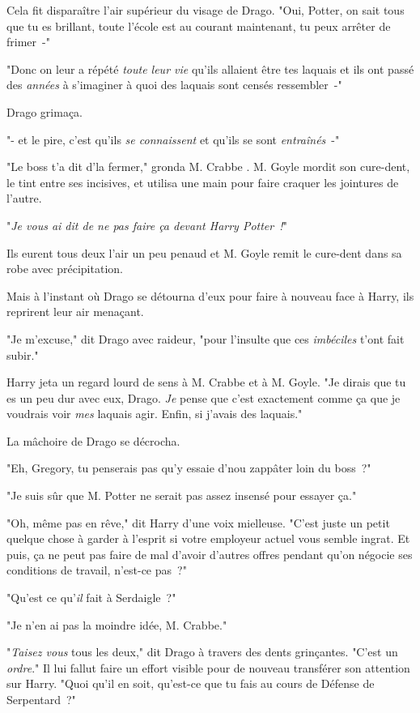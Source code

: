 Cela fit disparaître l'air supérieur du visage de Drago. "Oui, Potter, on sait tous que tu es brillant, toute l'école est au courant maintenant, tu peux arrêter de frimer~-"

"Donc on leur a répété \emph{toute leur vie} qu'ils allaient être tes laquais et ils ont passé des \emph{années} à s'imaginer à quoi des laquais sont censés ressembler~-"

Drago grimaça.

"- et le pire, c'est qu'ils \emph{se connaissent} et qu'ils se sont \emph{entraînés}~-"

"Le boss t'a dit d'la fermer," gronda M. Crabbe . M. Goyle mordit son cure-dent, le tint entre ses incisives, et utilisa une main pour faire craquer les jointures de l'autre.

"\emph{Je vous ai dit de ne pas faire ça devant Harry Potter~!}"

Ils eurent tous deux l'air un peu penaud et M. Goyle remit le cure-dent dans sa robe avec précipitation.

Mais à l'instant où Drago se détourna d'eux pour faire à nouveau face à Harry, ils reprirent leur air menaçant.

"Je m'excuse," dit Drago avec raideur, "pour l'insulte que ces \emph{imbéciles} t'ont fait subir."

Harry jeta un regard lourd de sens à M. Crabbe et à M. Goyle. "Je dirais que tu es un peu dur avec eux, Drago. \emph{Je} pense que c'est exactement comme ça que je voudrais voir \emph{mes} laquais agir. Enfin, si j'avais des laquais."

La mâchoire de Drago se décrocha.

"Eh, Gregory, tu penserais pas qu'y essaie d'nou zappâter loin du boss~?"

"Je suis sûr que M. Potter ne serait pas assez insensé pour essayer ça."

"Oh, même pas en rêve," dit Harry d'une voix mielleuse. "C'est juste un petit quelque chose à garder à l'esprit si votre employeur actuel vous semble ingrat. Et puis, ça ne peut pas faire de mal d'avoir d'autres offres pendant qu'on négocie ses conditions de travail, n'est-ce pas~?"

"Qu'est ce qu'\emph{il} fait à Serdaigle~?"

"Je n'en ai pas la moindre idée, M. Crabbe."

"\emph{Taisez vous} tous les deux," dit Drago à travers des dents grinçantes. "C'est un \emph{ordre}." Il lui fallut faire un effort visible pour de nouveau transférer son attention sur Harry. "Quoi qu'il en soit, qu'est-ce que tu fais au cours de Défense de Serpentard~?"

